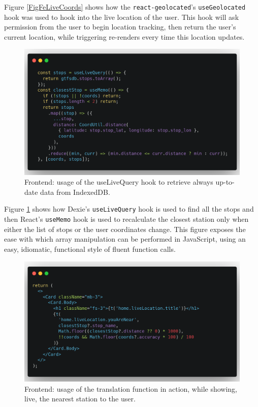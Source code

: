 Figure \ref{FigFeLiveCoords} shows how the \verb|react-geolocated|'s \verb|useGeolocated| hook was used to hook into the live location of the user. This hook will ask permission from the user to begin location tracking, then return the user's current location, while triggering re-renders every time this location updates.

\begin{figure}[htbp]
    \centering
    \includegraphics[width=.8\textwidth]{./figures/code/fe_live_queries.png}
    \caption{Frontend: usage of the useLiveQuery hook to retrieve always up-to-date data from IndexedDB.}
    \label{FigFeLiveQueries}
\end{figure}

Figure \ref{FigFeLiveQueries} shows how Dexie's \verb|useLiveQuery| hook is used to find all the stops and then React's \verb|useMemo| hook is used to recalculate the closest station only when either the list of stops or the user coordinates change. This figure exposes the ease with which array manipulation can be performed in JavaScript, using an easy, idiomatic, functional style of fluent function calls.

\begin{figure}[htbp]
    \centering
    \includegraphics[width=.8\textwidth]{./figures/code/fe_live_jsx.png}
    \caption{Frontend: usage of the translation function in action, while showing, live, the nearest station to the user.}
    \label{FigFeLiveJsx}
\end{figure}

